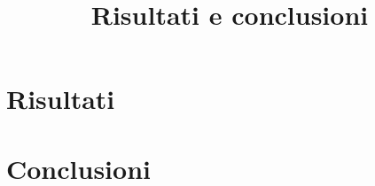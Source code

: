 \title{Risultati e conclusioni}
\maketitle
\label{sec:conclusions}



\section{Risultati}

\section{Conclusioni}

